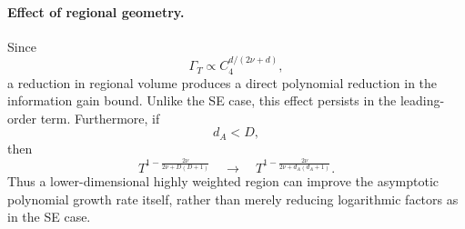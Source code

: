 \paragraph{Effect of regional geometry.}

Since
\begin{equation*}
\Gamma_T
\propto
C_4^{d/(2\nu+d)},
\end{equation*}
a reduction in regional volume produces a direct polynomial reduction in the information gain bound. Unlike the SE case, this effect persists in the leading-order term.
Furthermore, if
\begin{equation*}
d_A<D,
\end{equation*}
then
\begin{equation*}
T^{1-\frac{2\nu}{2\nu+D(D+1)}}
\quad\longrightarrow\quad
T^{1-\frac{2\nu}{2\nu+d_A(d_A+1)}}.
\end{equation*}
Thus a lower-dimensional highly weighted region can improve the asymptotic polynomial growth rate itself, rather than merely reducing logarithmic factors as in the SE case.
